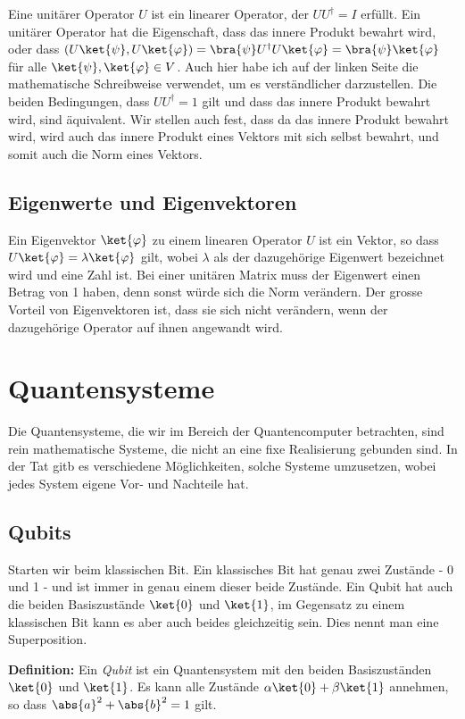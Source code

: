 Eine unitärer Operator $U$ ist ein linearer Operator, der $UU^{\dagger} = I$ erfüllt. Ein unitärer Operator hat die Eigenschaft, dass das innere Produkt bewahrt wird, oder dass $(U\ket{\psi}, U\ket{\varphi}) = \bra{\psi}U^{\dagger}U\ket{\varphi} = \bra{\psi}\ket{\varphi}$ für alle $\ket{\psi}, \ket{\varphi} \in V$. Auch hier habe ich auf der linken Seite die mathematische Schreibweise verwendet, um es verständlicher darzustellen. Die beiden Bedingungen, dass $UU^{\dagger} = 1$ gilt und dass das innere Produkt bewahrt wird, sind äquivalent. Wir stellen auch fest, dass da das innere Produkt bewahrt wird, wird auch das innere Produkt eines Vektors mit sich selbst bewahrt, und somit auch die Norm eines Vektors.

\subsection{Eigenwerte und Eigenvektoren}
Ein Eigenvektor $\ket{\varphi}$ zu einem linearen Operator $U$ ist ein Vektor, so dass $U\ket{\varphi} = \lambda\ket{\varphi}$ gilt, wobei $\lambda$ als der dazugehörige Eigenwert bezeichnet wird und eine Zahl ist. Bei einer unitären Matrix muss der Eigenwert einen Betrag von 1 haben, denn sonst würde sich die Norm verändern. Der grosse Vorteil von Eigenvektoren ist, dass sie sich nicht verändern, wenn der dazugehörige Operator auf ihnen angewandt wird.

\section{Quantensysteme}
Die Quantensysteme, die wir im Bereich der Quantencomputer betrachten, sind rein mathematische Systeme, die nicht an eine fixe Realisierung gebunden sind. In der Tat gitb es verschiedene Möglichkeiten, solche Systeme umzusetzen, wobei jedes System eigene Vor- und Nachteile hat.

\subsection{Qubits}
Starten wir beim klassischen Bit. Ein klassisches Bit hat genau zwei Zustände - 0 und 1 - und ist immer in genau einem dieser beide Zustände. Ein Qubit hat auch die beiden Basiszustände $\ket{0}$ und $\ket{1}$, im Gegensatz zu einem klassischen Bit kann es aber auch beides gleichzeitig sein. Dies nennt man eine Superposition. 

\textbf{Definition:} Ein \textit{Qubit} ist ein Quantensystem mit den beiden Basiszuständen $\ket{0}$ und $\ket{1}$. Es kann alle Zustände $\alpha\ket{0} + \beta\ket{1}$ annehmen, so dass $\abs{a}^2 + \abs{b}^2 = 1$ gilt.

